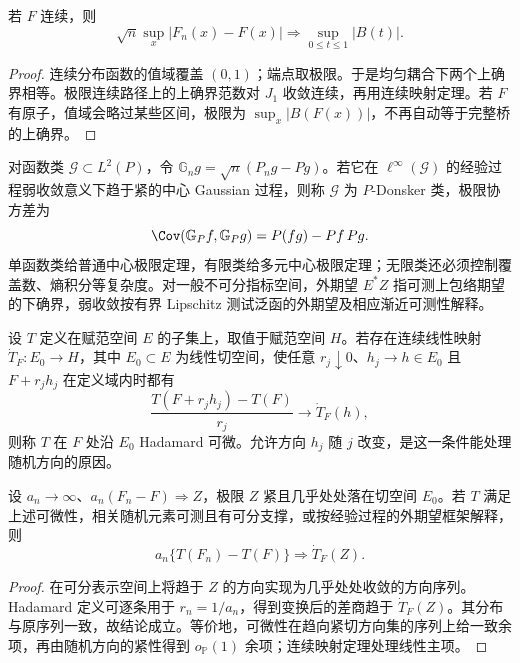 \begin{corollary}
若 $F$ 连续，则
\[
 \sqrt n\sup_x|F_n(x)-F(x)|
 \Longrightarrow\sup_{0\le t\le1}|B(t)|.
\]
\end{corollary}
\begin{proof}
连续分布函数的值域覆盖 $(0,1)$；端点取极限。于是均匀耦合下两个上确界相等。极限连续路径上的上确界范数对 $J_1$ 收敛连续，再用连续映射定理。若 $F$ 有原子，值域会略过某些区间，极限为 $\sup_x|B(F(x))|$，不再自动等于完整桥的上确界。
\end{proof}

\begin{definition}[一般函数类的经验过程]
对函数类 $\mathcal G\subset L^2(P)$，令 $\mathbb G_ng=\sqrt n(P_ng-Pg)$。若它在 $\ell^\infty(\mathcal G)$ 的经验过程弱收敛意义下趋于紧的中心 Gaussian 过程，则称 $\mathcal G$ 为 $P$-Donsker 类，极限协方差为
\[
 \Cov(\mathbb G_Pf,\mathbb G_Pg)=P(fg)-Pf\,Pg.
\]
单函数类给普通中心极限定理，有限类给多元中心极限定理；无限类还必须控制覆盖数、熵积分等复杂度。对一般不可分指标空间，外期望 $E^*Z$ 指可测上包络期望的下确界，弱收敛按有界 Lipschitz 测试泛函的外期望及相应渐近可测性解释。
\end{definition}

\begin{definition}[Hadamard 可微]
设 $T$ 定义在赋范空间 $E$ 的子集上，取值于赋范空间 $H$。若存在连续线性映射 $\dot T_F:E_0\to H$，其中 $E_0\subset E$ 为线性切空间，使任意 $r_j\downarrow0$、$h_j\to h\in E_0$ 且 $F+r_jh_j$ 在定义域内时都有
\[
 \frac{T(F+r_jh_j)-T(F)}{r_j}\longrightarrow\dot T_F(h),
\]
则称 $T$ 在 $F$ 处沿 $E_0$ Hadamard 可微。允许方向 $h_j$ 随 $j$ 改变，是这一条件能处理随机方向的原因。
\end{definition}

\begin{theorem}[泛函 $\Delta$ 方法]
设 $a_n\to\infty$、$a_n(F_n-F)\Longrightarrow Z$，极限 $Z$ 紧且几乎处处落在切空间 $E_0$。若 $T$ 满足上述可微性，相关随机元素可测且有可分支撑，或按经验过程的外期望框架解释，则
\[
 a_n\{T(F_n)-T(F)\}\Longrightarrow\dot T_F(Z).
\]
\end{theorem}
\begin{proof}
在可分表示空间上将趋于 $Z$ 的方向实现为几乎处处收敛的方向序列。Hadamard 定义可逐条用于 $r_n=1/a_n$，得到变换后的差商趋于 $\dot T_F(Z)$。其分布与原序列一致，故结论成立。等价地，可微性在趋向紧切方向集的序列上给一致余项，再由随机方向的紧性得到 $o_{\mathbb P}(1)$ 余项；连续映射定理处理线性主项。
\end{proof}

